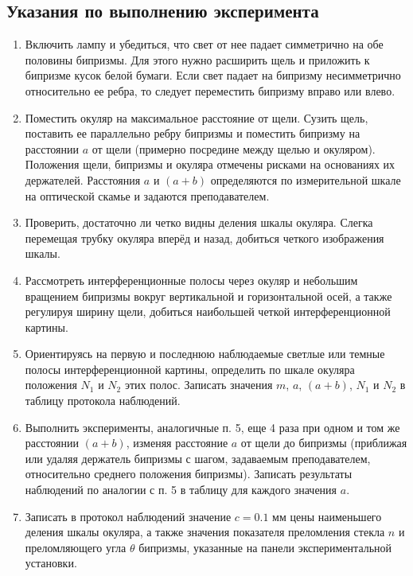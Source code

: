 \newpage
\subsection*{Указания по выполнению эксперимента}
\begin{enumerate}
    \item Включить лампу и убедиться, что свет от нее падает симметрично на обе половины бипризмы. Для этого нужно расширить щель и приложить к бипризме кусок белой бумаги. Если свет падает на бипризму несимметрично относительно ее ребра, то следует переместить бипризму вправо или влево.
    \item Поместить окуляр на максимальное расстояние от щели. Сузить щель, поставить ее параллельно ребру бипризмы и поместить бипризму на расстоянии $a$ от щели (примерно посредине между щелью и окуляром). Положения щели, бипризмы и окуляра отмечены рисками на основаниях их держателей. Расстояния $a$ и $(a+b)$ определяются по измерительной шкале на оптической скамье и задаются преподавателем.
    \item Проверить, достаточно ли четко видны деления шкалы окуляра. Слегка перемещая трубку окуляра вперёд и назад, добиться четкого изображения шкалы.
    \item Рассмотреть интерференционные полосы через окуляр и небольшим вращением бипризмы вокруг вертикальной и горизонтальной осей, а также регулируя ширину щели, добиться наибольшей четкой интерференционной картины.
    \item Ориентируясь на первую и последнюю наблюдаемые светлые или темные полосы интерференционной картины, определить по шкале окуляра положения $N_{1}$ и $N_{2}$ этих полос. Записать значения $m$, $a$, $(a+b)$, $N_{1}$ и $N_{2}$ в таблицу протокола наблюдений.
    \item Выполнить эксперименты, аналогичные п. 5, еще 4 раза при одном и том же расстоянии $(a+b)$, изменяя расстояние $a$ от щели до бипризмы (приближая или удаляя держатель бипризмы с шагом, задаваемым преподавателем, относительно среднего положения бипризмы). Записать результаты наблюдений по аналогии с п. 5 в таблицу для каждого значения $a$.
    \item Записать в протокол наблюдений значение $c = 0.1$ мм цены наименьшего деления шкалы окуляра, а также значения показателя преломления стекла $n$ и преломляющего угла $\theta$ бипризмы, указанные на панели экспериментальной установки.
\end{enumerate}




